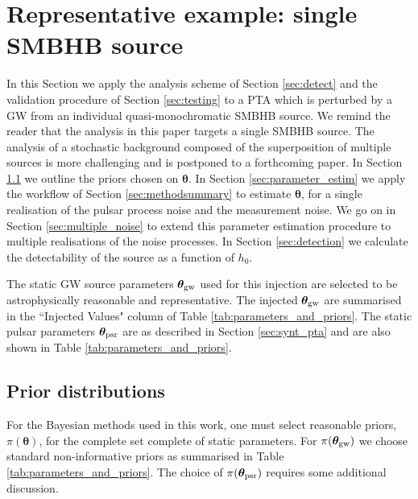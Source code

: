 \documentclass[fleqn,usenatbib,useAMS]{mnras}
\begin{document}
\section{Representative example: single SMBHB source}\label{sec:rep_example}
In this Section we apply the analysis scheme of Section \ref{sec:detect} and the validation procedure of Section \ref{sec:testing} to a PTA which is perturbed by a GW from an individual quasi-monochromatic SMBHB source. We remind the reader that the analysis in this paper targets a single SMBHB source. The analysis of a stochastic background composed of the superposition of multiple sources is more challenging and is postponed to a forthcoming paper. In Section \ref{sec:priors} we outline the priors chosen on $\boldsymbol{\theta}$. In Section \ref{sec:parameter_estim} we apply the workflow of Section \ref{sec:methodsummary} to estimate $\boldsymbol{\theta}$, for a single realisation of the pulsar process noise and the measurement noise. We go on in Section \ref{sec:multiple_noise} to extend this parameter estimation procedure to multiple realisations of the noise processes. In Section \ref{sec:detection} we calculate the detectability of the source as a function of $h_0$. \newline


The static GW source parameters $\boldsymbol{\theta}_{\rm gw}$ used for this injection are selected to be astrophysically reasonable and representative. The injected $\boldsymbol{\theta}_{\rm gw}$ are summarised in the ``Injected Values" column of Table \ref{tab:parameters_and_priors}. The static pulsar parameters $\boldsymbol{\theta}_{\rm psr}$ are as described in Section \ref{sec:synt_pta} and are also shown in Table \ref{tab:parameters_and_priors}. 

\subsection{Prior distributions}\label{sec:priors}
For the Bayesian methods used in this work, one must select reasonable priors, $\pi(\boldsymbol{\theta})$, for the complete set complete of static parameters. For $\pi(\boldsymbol{\theta}_{\rm gw})$ we choose standard non-informative priors \citep[e.g.][]{Bhagwat2021} as summarised in Table \ref{tab:parameters_and_priors}. The choice of $\pi(\boldsymbol{\theta}_{\rm psr})$ requires some additional discussion. \newline 
\end{document}
